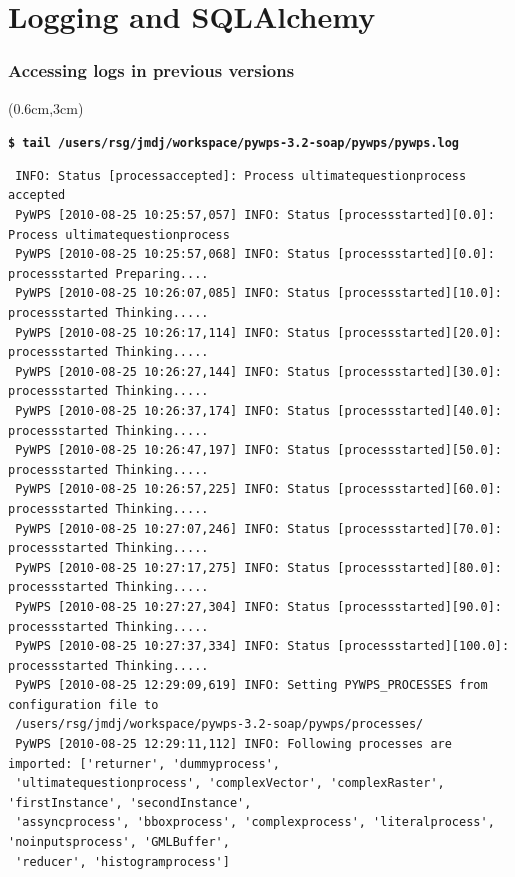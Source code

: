 \documentclass{beamer}
\begin{document}
\section{Logging and SQLAlchemy}

\begin{frame}[fragile]
\frametitle<presentation>{Accessing logs in previous versions}

\begin{textblock*}{6cm}(0.6cm,3cm)
\tiny{
\textbf{\texttt{\$~tail~/users/rsg/jmdj/workspace/pywps-3.2-soap/pywps/pywps.log}}
\begin{lstlisting}
 INFO: Status [processaccepted]: Process ultimatequestionprocess accepted
 PyWPS [2010-08-25 10:25:57,057] INFO: Status [processstarted][0.0]: Process ultimatequestionprocess
 PyWPS [2010-08-25 10:25:57,068] INFO: Status [processstarted][0.0]: processstarted Preparing....
 PyWPS [2010-08-25 10:26:07,085] INFO: Status [processstarted][10.0]: processstarted Thinking.....
 PyWPS [2010-08-25 10:26:17,114] INFO: Status [processstarted][20.0]: processstarted Thinking.....
 PyWPS [2010-08-25 10:26:27,144] INFO: Status [processstarted][30.0]: processstarted Thinking.....
 PyWPS [2010-08-25 10:26:37,174] INFO: Status [processstarted][40.0]: processstarted Thinking.....
 PyWPS [2010-08-25 10:26:47,197] INFO: Status [processstarted][50.0]: processstarted Thinking.....
 PyWPS [2010-08-25 10:26:57,225] INFO: Status [processstarted][60.0]: processstarted Thinking.....
 PyWPS [2010-08-25 10:27:07,246] INFO: Status [processstarted][70.0]: processstarted Thinking.....
 PyWPS [2010-08-25 10:27:17,275] INFO: Status [processstarted][80.0]: processstarted Thinking.....
 PyWPS [2010-08-25 10:27:27,304] INFO: Status [processstarted][90.0]: processstarted Thinking.....
 PyWPS [2010-08-25 10:27:37,334] INFO: Status [processstarted][100.0]: processstarted Thinking.....
 PyWPS [2010-08-25 12:29:09,619] INFO: Setting PYWPS_PROCESSES from configuration file to 
 /users/rsg/jmdj/workspace/pywps-3.2-soap/pywps/processes/
 PyWPS [2010-08-25 12:29:11,112] INFO: Following processes are imported: ['returner', 'dummyprocess', 
 'ultimatequestionprocess', 'complexVector', 'complexRaster', 'firstInstance', 'secondInstance', 
 'assyncprocess', 'bboxprocess', 'complexprocess', 'literalprocess', 'noinputsprocess', 'GMLBuffer', 
 'reducer', 'histogramprocess']
\end{lstlisting}
}
\end{textblock*}
\end{frame}
\end{document}
